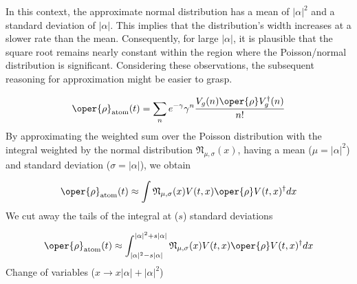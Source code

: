 In this context, the approximate normal distribution has a mean of \( |\alpha|^2 \) and a 
standard deviation of \( |\alpha| \). This implies that the distribution's width increases 
at a slower rate than the mean. Consequently, for large \( |\alpha| \), it is plausible 
that the square root remains nearly constant within the region where the Poisson/normal 
distribution is significant. Considering these observations, the subsequent reasoning 
for approximation might be easier to grasp.

\begin{equation}
\oper{\rho}_{\text{atom}}(t) = \sum_n e^{-\gamma} \gamma^n \frac{V_g(n)\oper{\rho} V_g^\dagger(n)}{n!}
\end{equation}
By approximating the weighted sum over the Poisson distribution with the integral weighted by 
the normal distribution \( \mathfrak{N}_{\mu, \sigma}(x)\), having a mean (\( \mu =  |\alpha|^2 \)) 
and standard deviation (\( \sigma = |\alpha| \)), we obtain

\begin{equation}
    \oper{\rho}_{\text{atom}}(t)\approx \int \mathfrak{N}_{\mu, \sigma}(x) V(t, x) \oper{\rho} V(t, x)^{\dagger} dx
\end{equation}
We cut away the tails of the integral at (\( s \)) standard deviations

\begin{equation}
    \oper{\rho}_{\text{atom}}(t)\approx \int_{|\alpha|^2 - s|\alpha|}^{|\alpha|^2 + s|\alpha|}\mathfrak{N}_{\mu, \sigma}(x) V(t, x) \oper{\rho} V(t, x)^{\dagger} dx
\end{equation}
Change of variables (\( x \to x|\alpha| + |\alpha|^2 \))

